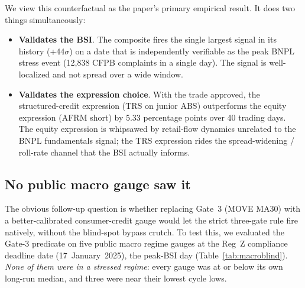 \documentclass[11pt,letterpaper]{article}
\begin{document}
We view this counterfactual as the paper's primary empirical result.
It does two things simultaneously:
\begin{itemize}[leftmargin=*,itemsep=2pt]
\item \textbf{Validates the BSI}. The composite fires
the single largest signal in its history (+44$\sigma$) on a date
that is independently verifiable as the peak BNPL stress event
(12{,}838 CFPB complaints in a single day). The signal is
well-localized and not spread over a wide window.
\item \textbf{Validates the expression choice}. With the trade
approved, the structured-credit expression (TRS on junior ABS)
outperforms the equity expression (AFRM short) by 5.33 percentage
points over 40 trading days. The equity expression is whipsawed by
retail-flow dynamics unrelated to the BNPL fundamentals signal; the
TRS expression rides the spread-widening / roll-rate channel that
the BSI actually informs.
\end{itemize}

\subsection{No public macro gauge saw it}
\label{sec:macroblind}

The obvious follow-up question is whether replacing Gate~3 (MOVE MA30)
with a better-calibrated consumer-credit gauge would let the strict
three-gate rule fire natively, without the blind-spot bypass
crutch. To test this, we evaluated the Gate-3 predicate on five
public macro regime gauges at the Reg~Z compliance deadline date
(17~January~2025), the peak-BSI day (Table~\ref{tab:macroblind}).
\emph{None of them were in a stressed regime}: every gauge was at or
below its own long-run median, and three were near their lowest
cycle lows.
\end{document}
